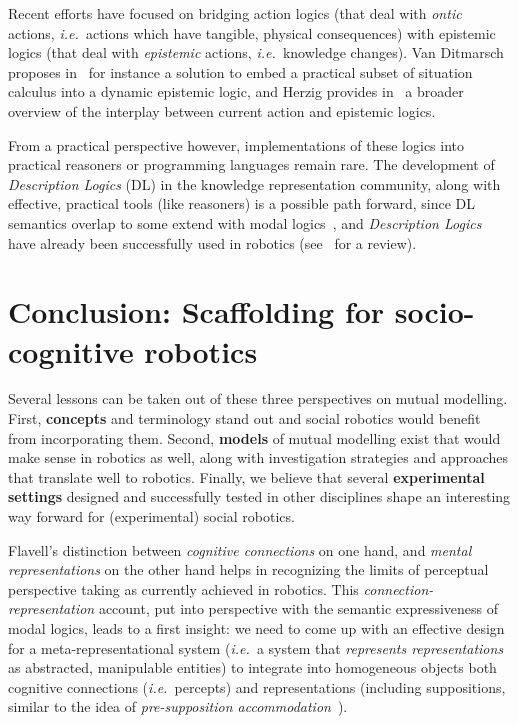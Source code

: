 \documentclass{sig-alternate}
\newcommand{\ie}{{\textit{i.e.~}}}
\begin{document}
Recent efforts have focused on bridging action logics (that deal with
\emph{ontic} actions, \ie actions which have tangible, physical consequences)
with epistemic logics (that deal with \emph{epistemic} actions, \ie knowledge
changes). Van Ditmarsch proposes in~\cite{ditmarsch2010from} for instance a
solution to embed a practical subset of situation calculus into a dynamic
epistemic logic, and Herzig provides in~\cite{herzig2014logics} a broader
overview of the interplay between current action and epistemic logics.

From a practical perspective however, implementations of these logics into
practical reasoners or programming languages remain rare. The development of
\emph{Description Logics} (DL) in the knowledge representation community, along
with effective, practical tools (like reasoners) is a possible path forward,
since DL semantics overlap to some extend with modal logics~\cite[chap.
4.2.2]{baader2003description}, and \emph{Description Logics} have already been
successfully used in robotics (see~\cite{lemaignan2012symbolic} for a review).


\section{Conclusion: Scaffolding for socio-cognitive robotics}

Several lessons can be taken out of these three perspectives on mutual modelling.
First, \textbf{concepts} and terminology stand out and social robotics would
benefit from incorporating them. Second, \textbf{models} of mutual modelling exist
that would make sense in robotics as well, along with investigation strategies
and approaches that translate well to robotics. Finally, we believe that several
\textbf{experimental settings} designed and successfully tested in other
disciplines shape an interesting way forward for (experimental) social robotics.

Flavell's distinction between \emph{cognitive connections} on one hand, and
\emph{mental representations} on the other hand helps in recognizing the limits
of perceptual perspective taking as currently achieved in robotics.  This
\emph{connection-representation} account, put into perspective with the semantic
expressiveness of modal logics, leads to a first insight: we need to come up
with an effective design for a meta-representational system (\ie a system that \emph{represents
representations} as abstracted, manipulable entities) to integrate into
homogeneous objects both cognitive connections (\ie percepts) and representations
(including suppositions, similar to the idea of \emph{pre-supposition
accommodation}~\cite{Mavridis2006}).
\end{document}
